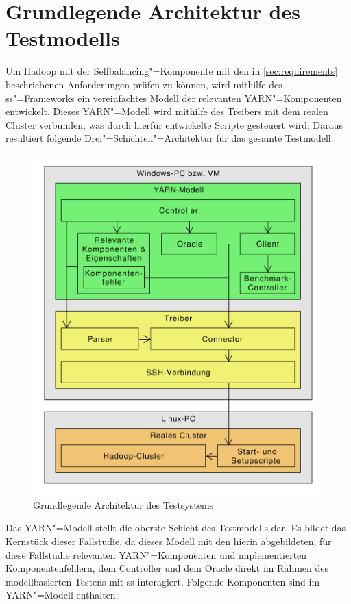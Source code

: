 \section{Grundlegende Architektur des Testmodells}
\label{sec:modelArchitecture}

Um Hadoop mit der Selfbalancing"=Komponente mit den in \cref{sec:requirements} beschriebenen Anforderungen prüfen zu können, wird mithilfe des \ac{ss}"=Frameworks ein vereinfachtes Modell der relevanten \ac{YARN}"=Komponenten entwickelt.
Dieses \ac{YARN}"=Modell wird mithilfe des Treibers mit dem realen Cluster verbunden, was durch hierfür entwickelte Scripte gesteuert wird.
Daraus resultiert folgende Drei"=Schichten"=Architektur für das gesamte Testmodell:

\begin{figure}[h]
    \includegraphics[width=0.6\columnwidth]{./resources/modelArchitecture.pdf}
    \caption{Grundlegende Architektur des Testsystems}
    \label{fig:modelArchitecture}
\end{figure}

Das \ac{YARN}"=Modell stellt die oberste Schicht des Testmodells dar.
Es bildet das Kernstück dieser Fallstudie, da dieses Modell mit den hierin abgebildeten, für diese Fallstudie relevanten \ac{YARN}"=Komponenten und implementierten Komponentenfehlern, dem Controller und dem Oracle direkt im Rahmen des modellbasierten Testens mit \ac{ss} interagiert.
Folgende Komponenten sind im \ac{YARN}"=Modell enthalten:

